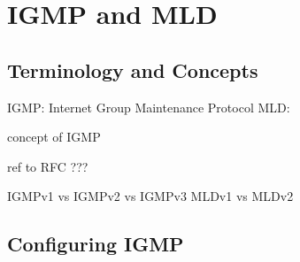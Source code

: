 \chapter{IGMP and MLD}

\section{Terminology and Concepts}

IGMP: Internet Group Maintenance Protocol
MLD:

concept of IGMP

ref to RFC ???

IGMPv1 vs IGMPv2 vs IGMPv3
MLDv1 vs MLDv2

\section{Configuring IGMP}
